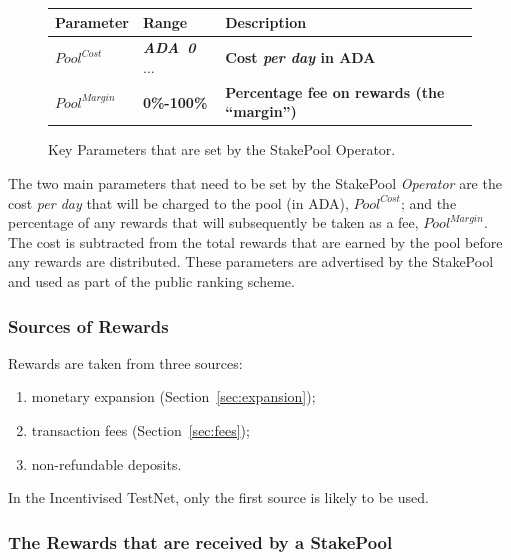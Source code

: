 \documentclass[11pt,a4paper,dvipsnames,twosided,final]{article}
\newcommand{\ada}{ADA{}}
\newcommand{\ADA}[1]{\textbf{\emph{\ada~{#1}}}}
\begin{document}
\begin{figure}[h!]
\begin{center}
\begin{tabular}{||l|l|p{9cm}||}
  \hline \hline
\textbf{Parameter} & \textbf{Range} & \textbf{Description} \\\hline
       \textbf{\color{red} $\textit{Pool}^{\textit{Cost}}$} &  \textbf{\color{red}  \ADA{0} $\ldots$} & \textbf{\color{red} Cost
         \emph{per day} in \ada{}} \\\hline
\textbf{\color{red} ${\textit{Pool}}^{\textit{Margin}}$} &  \textbf{\color{red} 0\%-100\%} & \textbf{\color{red} Percentage fee on rewards (the ``margin'')} \\\hline
  \hline
\end{tabular}
\end{center}
\caption{Key Parameters that are set by the StakePool Operator.}
\end{figure}

\noindent
The two main parameters that need to be set by the StakePool \emph{Operator} are the cost \emph{per day} that will be charged to
the pool (in \ada), $\textit{Pool}^{\textit{Cost}}$; and the percentage of any rewards that will subsequently be taken as a fee, ${\textit{Pool}}^{\textit{Margin}}$.
The cost is subtracted from the total rewards that are earned by the pool before any rewards are distributed.
These parameters are advertised by the StakePool and used as part of the public ranking scheme.

\subsubsection*{Sources of Rewards}

Rewards are taken from three sources:

\begin{enumerate}
\item
  monetary expansion (Section~\ref{sec:expansion});
\item
  transaction fees (Section~\ref{sec:fees});
\item
  non-refundable deposits.
\end{enumerate}

\noindent
In the Incentivised TestNet, only the first source is likely to be used.

\subsubsection*{The Rewards that are received by a StakePool}
\end{document}
